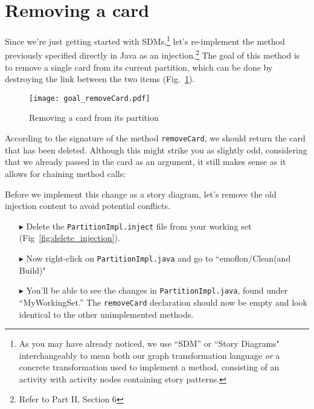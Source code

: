 \newpage
\genHeader
\section{Removing a card}
\hypertarget{sec:remCard}{}

Since we're just getting started with SDMs,\footnote{As you may have already noticed, we use ``SDM'' or ``Story Diagrams" interchangeably to mean both our graph
transformation language \emph{or} a concrete transformation used to implement a method, consisting of an activity with activity nodes containing story
patterns.} let's re-implement the method previously specified directly in Java as an injection.\footnote{Refer to Part II, Section 6} The goal of this method
is to remove a single card from its current partition, which can be done by destroying the link between the two items (Fig.~\ref{fig:goal_removeCard}).

\vspace{1cm}

\begin{figure}[htbp]
	\centering
    \texttt{[image: goal\_removeCard.pdf]}
	\caption{Removing a card from its partition}
	\label{fig:goal_removeCard}
\end{figure}
\FloatBarrier

\vspace{0.5cm}

According to the signature of the method \texttt{removeCard}, we should return the card that has been deleted. Although this might strike you as slightly odd,
considering that we already passed in the card as an argument, it still makes sense as it allows for chaining method calls:

Before we implement this change as a story diagram, let's remove the old injection content to avoid potential conflicts.

\begin{itemize}

\item[$\blacktriangleright$] Delete the \texttt{PartitionImpl.inject} file from your working set (Fig~\ref{fig:delete_injection}).

\item[$\blacktriangleright$] Now right-click on \texttt{PartitionImpl.java} and go to ``emoflon/Clean(and Build)" 

\item[$\blacktriangleright$] You'll be able to see the changes in \texttt{PartitionImpl.java}, found under ``MyWorkingSet.'' The \texttt{removeCard}
declaration should now be empty and look identical to the other unimplemented methods.

\end{itemize}

